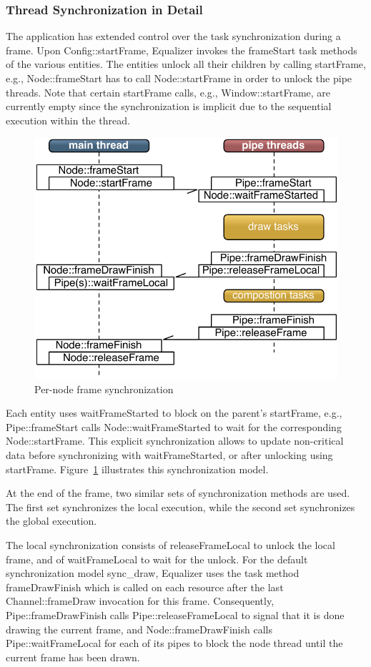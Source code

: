 \documentclass[10pt,a4]{scrartcl}
\newcommand{\fig}[1]{Figure~\ref{#1}}
\begin{document}
\subsubsection{Thread Synchronization in Detail}

The application has extended control over the task synchronization
during a frame. Upon \textsf{Config::startFrame}, Equalizer invokes the
\textsf{frameStart} task methods of the various entities. The entities
unlock all their children by calling \textsf{startFrame}, e.g.,
\textsf{Node::frameStart} has to call \textsf{Node::startFrame} in order
to unlock the pipe threads. Note that certain \textsf{startFrame} calls,
e.g., \textsf{Window::startFrame}, are currently empty since the
synchronization is implicit due to the sequential execution within the
thread.

\begin{figure}
  \includegraphics[width=.618\textwidth]{images/frameSync.pdf}
  {\caption{\label{fFrameSync}Per-node frame synchronization}}
\end{figure}
Each entity uses \textsf{waitFrame\-Started} to block on the parent's
\textsf{startFrame}, e.g., \textsf{Pipe::\-frame\-Start} calls
\textsf{Node::wait\-Frame\-Started} to wait for the corresponding
\textsf{Node::start\-Fra\-me}. This explicit synchronization allows to
update non-critical data before synchronizing with
\textsf{waitFrameStarted}, or after unlocking using
\textsf{start\-Fra\-me}. \fig{fFrameSync} illustrates this
synchronization model.

At the end of the frame, two similar sets of synchronization methods are
used. The first set synchronizes the local execution, while the second
set synchronizes the global execution.

The local synchronization consists of \textsf{releaseFrameLocal} to
unlock the local frame, and of \textsf{waitFrameLocal} to wait for the
unlock. For the default synchronization model \textsf{sync\_draw},
Equalizer uses the task method \textsf{frameDrawFinish} which is called
on each resource after the last \textsf{Channel::frameDraw} invocation
for this frame. Consequently, \textsf{Pipe::frameDraw\-Fi\-nish} calls
\textsf{Pipe::\-release\-Frame\-Lo\-cal} to signal that it is done
drawing the current frame, and \textsf{Node::frameDrawFinish} calls
\textsf{Pipe::waitFrameLocal} for each of its pipes to block the node
thread until the current frame has been drawn.
\end{document}
